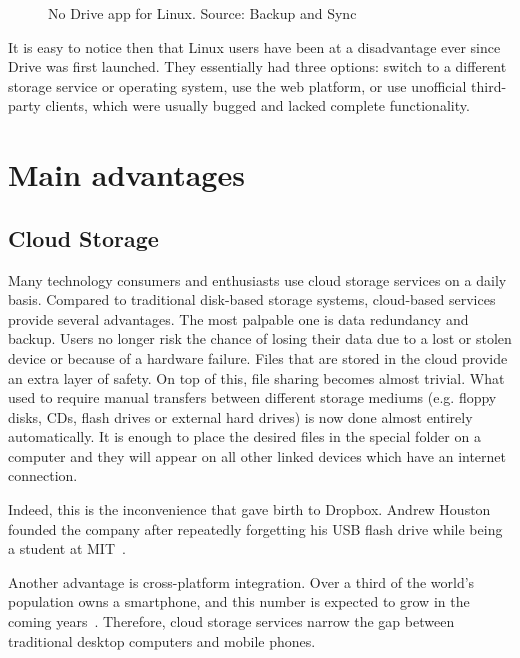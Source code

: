 \begin{figure}[bpt]
\caption{No Drive app for Linux. Source: Backup and Sync~\cite{no_official_drive_app_for_linux}}
\label{fig:no-drive-app-for-linux}
\centering
{}
\end{figure}

It is easy to notice then that Linux users have been at a disadvantage ever since Drive was first launched. They essentially had three options: switch to a different storage service or operating system, use the web platform, or use unofficial third-party clients, which were usually bugged and lacked complete functionality.

\section{Main advantages}

\subsection{Cloud Storage}

Many technology consumers and enthusiasts use cloud storage services on a daily basis. Compared to traditional disk-based storage systems, cloud-based services provide several advantages. The most palpable one is data redundancy and backup. Users no longer risk the chance of losing their data due to a lost or stolen device or because of a hardware failure. Files that are stored in the cloud provide an extra layer of safety. On top of this, file sharing becomes almost trivial. What used to require manual transfers between different storage mediums (e.g. floppy disks, CDs, flash drives or external hard drives) is now done almost entirely automatically. It is enough to place the desired files in the special folder on a computer and they will appear on all other linked devices which have an internet connection.

Indeed, this is the inconvenience that gave birth to Dropbox. Andrew Houston founded the company after repeatedly forgetting his USB flash drive while being a student at MIT~\cite{how_the_habit_of_forgetting}.

Another advantage is cross-platform integration. Over a third of the world's population owns a smartphone, and this number is expected to grow in the coming years~\cite{smartphone_ownership_usage_and_penetration_by_country}. Therefore, cloud storage services narrow the gap between traditional desktop computers and mobile phones.

